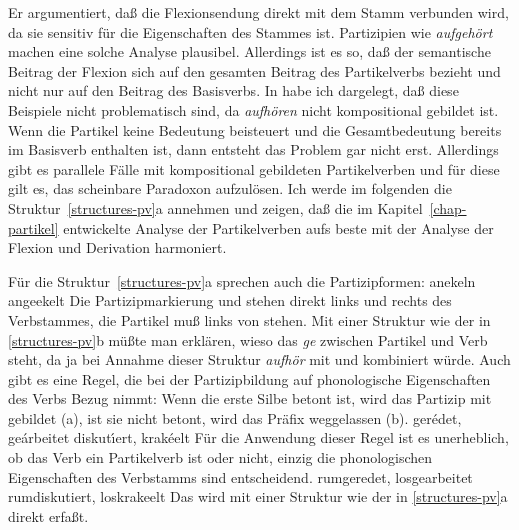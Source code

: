 %
Er argumentiert, daß die Flexionsendung direkt mit dem Stamm verbunden
wird, da sie sensitiv für die Eigenschaften des Stammes ist. Partizipien
wie \emph{aufgehört} machen eine solche Analyse plausibel. Allerdings ist
es so, daß der semantische Beitrag der Flexion sich auf den gesamten Beitrag
des Partikelverbs bezieht und nicht nur auf den Beitrag des Basisverbs.
In  habe ich dargelegt, daß diese Beispiele nicht problematisch
sind, da \emph{aufhören} nicht kompositional gebildet ist. Wenn die Partikel
keine Bedeutung beisteuert und die Gesamtbedeutung bereits im Basisverb
enthalten ist, dann entsteht das Problem gar nicht erst. Allerdings gibt
es parallele Fälle mit kompositional gebildeten Partikelverben und für diese
gilt es, das scheinbare Paradoxon aufzulösen. Ich werde im folgenden die
Struktur~\ref{structures-pv}a annehmen und zeigen, daß die im Kapitel~\ref{chap-partikel}
entwickelte Analyse der Partikelverben aufs beste mit der Analyse der
Flexion und Derivation harmoniert.

Für die Struktur~\ref{structures-pv}a sprechen auch die Partizipformen:
\eal
\ex anekeln
\ex angeekelt
\zl
Die Partizipmarkierung  und  stehen direkt links und rechts
des Verbstammes, die Partikel muß links von  stehen.
Mit einer Struktur wie der in \ref{structures-pv}b müßte man erklären, wieso
das \emph{ge} zwischen Partikel und Verb steht, da ja bei Annahme dieser
Struktur \emph{aufhör} mit  und  kombiniert würde.
Auch gibt es eine Regel, die bei der Partizipbildung auf phonologische
Eigenschaften des Verbs Bezug nimmt: Wenn die erste Silbe betont ist,
wird das Partizip mit   gebildet (a), ist sie nicht
betont, wird das Präfix  weggelassen (b).
\eal
\ex ger\'edet, ge\'arbeitet
\ex diskut{\'\i}ert, krak\'eelt
\zl
Für die Anwendung dieser Regel ist es unerheblich, ob das Verb ein
Partikelverb ist oder nicht, einzig die phonologischen Eigenschaften des Verbstamms
sind entscheidend.
\eal
\ex rumgeredet, losgearbeitet
\ex rumdiskutiert, loskrakeelt
\zl
Das wird mit einer Struktur wie der in \ref{structures-pv}a direkt erfaßt.

